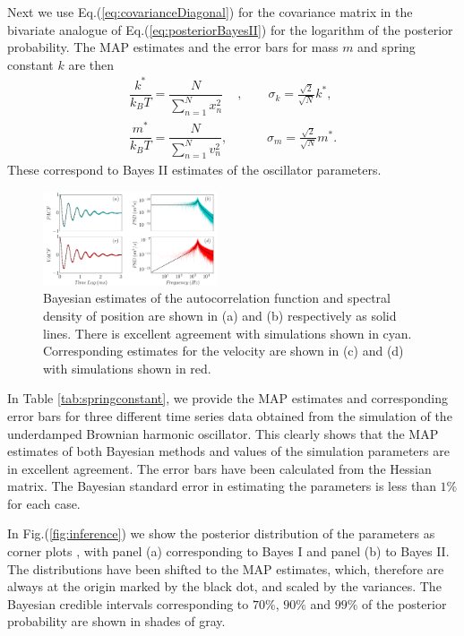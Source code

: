 \documentclass[english,aps, twocolumn, pre,superscriptaddress, notitlepage]{revtex4-1}
\begin{document}
Next we use Eq.(\ref{eq:covarianceDiagonal}) for the covariance matrix
in the bivariate analogue of Eq.(\ref{eq:posteriorBayesII}) for the
logarithm of the posterior probability. The MAP estimates and the
error bars for mass $m$ and spring constant $k$ are then\begin{subequations}\label{eq:map_stationary}
\begin{align}
\dfrac{k^{\ast}}{k_{B}T}=\dfrac{N}{\sum_{n=1}^{N}x_{n}^{2}} & ,\qquad\sigma_{k}=\frac{\sqrt{2}}{\sqrt{N}}k^{\ast},\label{eq:map_k}\\
\dfrac{m^{\ast}}{k_{B}T}=\dfrac{N}{\sum_{n=1}^{N}v_{n}^{2}}, & \qquad\,\,\sigma_{m}=\frac{\sqrt{2}}{\sqrt{N}}m^{\ast}.\label{eq:map_v}
\end{align}
\end{subequations}These correspond to Bayes II estimates of the oscillator
parameters. 
\begin{figure}
\includegraphics[width=0.46\textwidth]{Fig3}

\caption{Bayesian estimates of the autocorrelation function and spectral density
of position are shown in (a) and (b) respectively as solid lines.
There is excellent agreement with simulations shown in cyan. Corresponding
estimates for the velocity are shown in (c) and (d) with simulations
shown in red. \label{fig:autocorrelation} }
\end{figure}

In Table \ref{tab:springconstant}, we provide the MAP estimates and
corresponding error bars for three different time series data obtained
from the simulation of the underdamped Brownian harmonic oscillator.
This clearly shows that the MAP estimates of both Bayesian methods
and values of the simulation parameters are in excellent agreement.
The error bars have been calculated from the Hessian matrix. The Bayesian
standard error in estimating the parameters is less than $1\%$ for
each case.

In Fig.(\ref{fig:inference}) we show the posterior distribution of
the parameters as corner plots \cite{foreman2016corner}, with panel
(a) corresponding to Bayes I and panel (b) to Bayes II. The distributions
have been shifted to the MAP estimates, which, therefore are always
at the origin marked by the black dot, and scaled by the variances.
The Bayesian credible intervals corresponding to $70\%$, $90\%$
and $99\%$ of the posterior probability are shown in shades of gray. 
\end{document}
